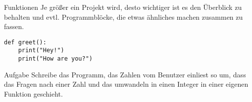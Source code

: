 \begin{frame}[fragile]{Funktionen}
Je größer ein Projekt wird, desto wichtiger ist es den Überblick zu behalten
und evtl. Programmblöcke, die etwas ähnliches machen zusammen zu fassen.

\begin{lstlisting}
def greet():
    print("Hey!")
    print("How are you?")
\end{lstlisting}
\begin{block}{Aufgabe}
Schreibe das Programm, das Zahlen vom Benutzer einliest so um, dass das Fragen nach
einer Zahl und das umwandeln in einen Integer in einer eigenen Funktion geschieht.
\end{block}
\end{frame}


